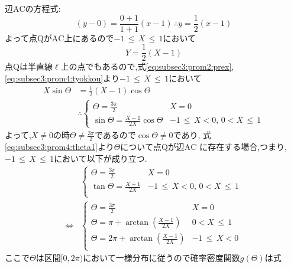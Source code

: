 \documentclass[dvipdfmx,titlepage, 11pt, a4paper]{jsarticle}%
\begin{document}
\begin{enumerate}[(1)]
  辺$\mathrm{AC}$の方程式:
  \begin{equation*}
    (y - 0) = \frac{0 + 1}{1 + 1}(x - 1)\, \therefore y = \frac{1}{2}(x - 1)
  \end{equation*}
  よって点$\mathrm{Q}$が$\mathrm{AC}$上にあるので$-1\, \leq\,  X\, \leq \, 1$において
  \begin{equation}
    Y = \frac{1}{2}(X - 1)\label{eq:subsec3:prom4:tyokkou}
  \end{equation}
  点$\mathrm{Q}$は半直線$\ell$上の点でもあるので,式\eqref{eq:subsec3:prom2:prex}, 
  \eqref{eq:subsec3:prom4:tyokkou}より$-1\, \leq\,  X\, \leq \, 1$において
  \begin{align}
    X\sin\Theta &= \frac{1}{2}\left(X - 1\right)\cos\Theta\nonumber\\
                &\therefore
                  \begin{cases}
                    \Theta = \frac{3\pi}{2} & X = 0\\
                    \sin\Theta = \frac{X - 1}{2X}\cos\Theta & -1\, \leq\, X < 0,\, 0 < X\, \leq\, 1
        \end{cases}\label{eq:subsec3:prom4:theta1}
  \end{align}
  よって,$X \neq 0$の時$\Theta \neq \frac{3\pi}{2}$であるので$\cos\Theta \neq 0$であり,
  式\eqref{eq:subsec3:prom4:theta1}より$\Theta$について点$\mathrm{Q}$が辺$\mathrm{AC}$
  に存在する場合,つまり,$-1\, \leq\, X\, \leq\, 1$において以下が成り立つ.
  \begin{align}
    &\begin{cases}
      \Theta = \frac{3\pi}{2} & X = 0\\
      \tan\Theta = \frac{X - 1}{2X} & -1\, \leq\, X < 0,\, 0 < X\, \leq\, 1\\
    \end{cases}\nonumber\\
    \Longleftrightarrow&
                         \begin{cases}
                           \Theta = \frac{3\pi}{2} & X = 0\\
                           \Theta = \pi + \arctan\left(\frac{X - 1}{2X}\right) & 0 < X \, \leq\, 1\\
                           \Theta = 2\pi + \arctan\left(\frac{X - 1}{2X}\right) & -1\, \leq\, X < 0\\
                         \end{cases}\label{eq:subsec3:prom4:theta2}
  \end{align}
  ここで$\Theta$は区間$[0, 2\pi)$において一様分布に従うので確率密度関数$g(\Theta)$は式

\end{enumerate}
\end{document}
